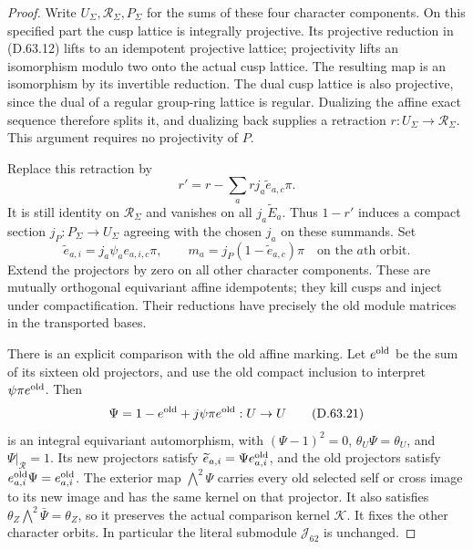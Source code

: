 \begin{proof}
Write \(U_\Sigma,\mathcal R_\Sigma,P_\Sigma\) for
the sums of these four character components.
On this specified part the cusp lattice is integrally
projective. Its projective reduction in (D.63.12)
lifts to an idempotent projective lattice; projectivity
lifts an isomorphism modulo two onto the actual
cusp lattice. The resulting map is an isomorphism
by its invertible reduction. The dual cusp lattice
is also projective, since the dual of a regular
group-ring lattice is regular. Dualizing the affine
exact sequence therefore splits it, and dualizing
back supplies a retraction
\(r:U_\Sigma\to\mathcal R_\Sigma\).
This argument requires no projectivity of \(P\).

Replace this retraction by
\[
                  r'=r-\sum_a rj_a\widetilde e_{a,c}\pi.
 \tag{D.63.19}
\]
It is still identity on \(\mathcal R_\Sigma\) and vanishes
on all \(j_a\widetilde E_a\). Thus \(1-r'\)
induces a compact section
\(j_P:P_\Sigma\to U_\Sigma\) agreeing
with the chosen \(j_a\) on these summands. Set
\[
 \widetilde e_{a,i}=j_a\psi_a e_{a,i,c}\pi,
 \qquad m_a=j_P(1-\widetilde e_{a,c})\pi
       \quad\text{on the }a\text{th orbit}.
 \tag{D.63.20}
\]
Extend the projectors by zero on all other character
components. These are mutually orthogonal equivariant affine
idempotents; they kill cusps and inject under
compactification. Their reductions have precisely
the old module matrices in the transported bases.

There is an explicit comparison with the old affine
marking. Let \(e^{\rm old}\) be the sum of its
sixteen old projectors, and use the old compact
inclusion to interpret \(\psi\pi e^{\rm old}\).
Then
\[
          \Psi=1-e^{\rm old}+j\psi\pi e^{\rm old}:U\to U
 \tag{D.63.21}
\]
is an integral equivariant automorphism, with
\((\Psi-1)^2=0\), \(\theta_U\Psi=\theta_U\), and
\(\Psi|_{\mathcal R}=1\). Its new projectors satisfy
\(\widetilde e_{a,i}=\Psi e_{a,i}^{\rm old}\),
and the old projectors satisfy
\(e_{a,i}^{\rm old}\Psi=e_{a,i}^{\rm old}\).
The exterior map \(\bigwedge^2\Psi\) carries every
old selected self or cross image to its new image
and has the same kernel on that projector.
It also satisfies
\(\theta_Z\bigwedge^2\bar\Psi=\theta_Z\), so it
preserves the actual comparison kernel \(\mathcal K\).
It fixes the other character orbits. In particular
the literal submodule \(\mathcal J_{62}\) is unchanged.


\end{proof}
